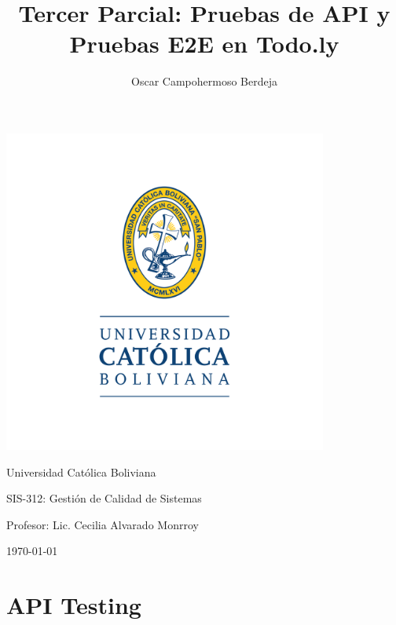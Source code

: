 \documentclass{report}
\title{Tercer Parcial: Pruebas de API y Pruebas E2E en Todo.ly}
\author{Oscar Campohermoso Berdeja}
\newcommand{\affiliation}{Universidad Católica Boliviana}
\newcommand{\course}{SIS-312: Gestión de Calidad de Sistemas}
\newcommand{\professor}{Lic. Cecilia Alvarado Monrroy}
\begin{document}
\begin{titlepage}
    \centering
    \includegraphics[width=0.8\textwidth]{./imgs/logo-ucb.png}\par
    {\Huge \textbf{\thetitle}\par}
    \vspace{0.5cm} %
    {\Large {\theauthor}\par}
    \vspace{0.5cm} %
    {\Large {\affiliation}\par}
    \vspace{0.5cm} %
    {\Large {\course}\par}
    \vspace{0.5cm} %
    {\Large {Profesor: \professor}\par}
    \vspace{0.5cm} %
    {\Large \today\par}
\end{titlepage}

\tableofcontents
\listoffigures
\chapter{API Testing}
\end{document}
